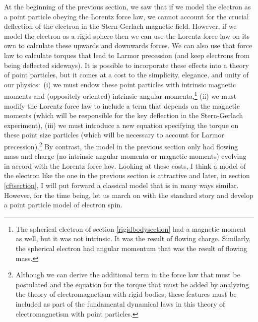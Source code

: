 \documentclass[12pt,secnumarabic,amsmath,amssymb,balancelastpage,nofootinbib]{article}
\begin{document}
At the beginning of the previous section, we saw that if we model the electron as a point particle obeying the Lorentz force law, we cannot account for the crucial deflection of the electron in the Stern-Gerlach magnetic field.  However, if we model the electron as a rigid sphere then we can use the Lorentz force law on its own to calculate these upwards and downwards forces.  We can also use that force law to calculate torques that lead to Larmor precession (and keep electrons from being deflected sideways).  It is possible to incorporate these effects into a theory of point particles, but it comes at a cost to the simplicity, elegance, and unity of our physics:\ (i) we must endow these point particles with intrinsic magnetic moments and (oppositely oriented) intrinsic angular momenta,\footnote{The spherical electron of section \ref{rigidbodysection} had a magnetic moment as well, but it was not intrinsic.  It was the result of flowing charge.  Similarly, the spherical electron had angular momentum that was the result of flowing mass.} (ii) we must modify the Lorentz force law to include a term that depends on the magnetic moments (which will be responsible for the key deflection in the Stern-Gerlach experiment), (iii) we must introduce a new equation specifying the torque on these point size particles (which will be necessary to account for Larmor precession).\footnote{Although we can derive the additional term in the force law that must be postulated and the equation for the torque that must be added by analyzing the theory of electromagnetism with rigid bodies, these features must be included as part of the fundamental dynamical laws in this theory of electromagnetism with point particles.}  By contrast, the model in the previous section only had flowing mass and charge (no intrinsic angular momenta or magnetic moments) evolving in accord with the Lorentz force law.  Looking at these costs, I think a model of the electron like the one in the previous section is attractive and later, in section \ref{cftsection}, I will put forward a classical model that is in many ways similar.  However, for the time being, let us march on with the standard story and develop a point particle model of electron spin.
\end{document}
